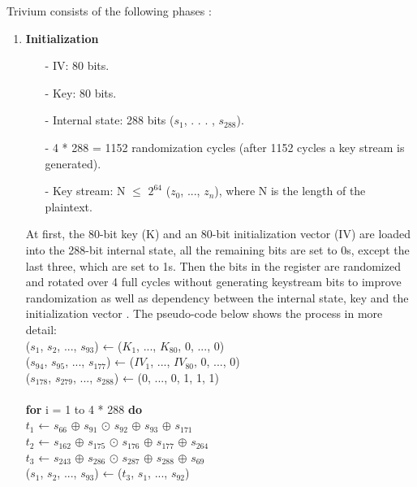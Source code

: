 Trivium consists of the following phases \cite{canniere2008trivium}:
\begin{enumerate}
	\item \textbf{Initialization}
	\begin{itemize}
		\setlength\itemsep{0.1em}
		\item[-] IV: 80 bits.
		\item[-] Key: 80 bits.
		\item[-] Internal state: 288 bits ($s_1$, . . . , $s_{288}$). 
		\item[-] 4 * 288 = 1152 randomization cycles (after 1152 cycles a key stream is generated).
		\item[-] Key stream: N $\leq$ $2^{64}$ ($z_0$, ..., $z_n$), where N is the length of the plaintext.
	\end{itemize}
	At first, the  80-bit key (K) and an 80-bit initialization vector (IV) are loaded into the 288-bit internal state, all the remaining bits are set to 0s, except the last three, which are set to 1s. Then the bits in the register are randomized and rotated over 4 full cycles without generating keystream bits to improve randomization as well as dependency between the internal state, key and the initialization vector .
	The pseudo-code below shows the process in more detail:
	\vspace{0.5em}
	\\
	{\selectfont
		($s_1$, $s_2$, ..., $s_93$) ← ($K_1$, ..., $K_{80}$, 0, ..., 0)\\
		($s_{94}$, $s_{95}$, ..., $s_{177}$) ← ($IV_1$, ..., $IV_{80}$, 0, ..., 0)\\
		($s_{178}$, $s_{279}$, ..., $s_{288}$) ← (0, ..., 0, 1, 1, 1)\\
		\\
		\textbf{for} i = 1 to 4 * 288 \textbf{do} \\
		\indent\hspace{1cm}$t_1$ ← $s_{66}$ $\oplus$ $s_{91}$ $\odot$ $s_{92}$ $\oplus$ $s_{93}$ $\oplus$ $s_{171}$\\
		\indent\hspace{1cm}$t_2$ ← $s_{162}$ $\oplus$ $s_{175}$ $\odot$ $s_{176}$ $\oplus$ $s_{177}$ $\oplus$ $s_{264}$\\
		\indent\hspace{1cm}$t_3$ ← $s_{243}$ $\oplus$ $s_{286}$ $\odot$ $s_{287}$ $\oplus$ $s_{288}$ $\oplus$ $s_{69}$\\
		\indent\hspace{1cm}($s_1$, $s_2$, ..., $s_{93}$) ← ($t_3$, $s_1$, ..., $s_{92}$)\\
}
\end{enumerate}

